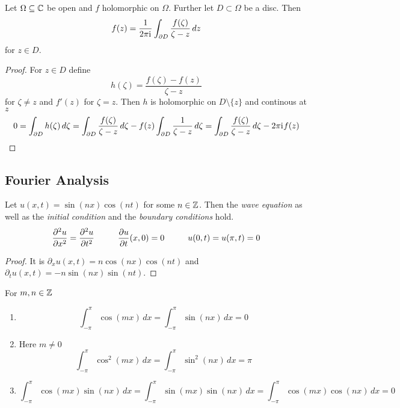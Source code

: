 \begin{theorem}
	Let \( \Omega \subseteq \mathbb{C} \) be open and \( f \) holomorphic on \( \Omega \). Further let \( D \subset \Omega \)
	be a disc. Then
	\[
		f(z) = \frac{1}{2\pi\iu} \int_{\boundary D} \frac{f(\zeta)}{\zeta - z}\,dz%
	\]
	for \( z \in D \).
\end{theorem}

\begin{proof}
	For \( z \in D \) define
	\[
		h(\zeta) = \frac{f(\zeta)- f(z)}{\zeta - z} %
	\]
	for \( \zeta \ne z \) and \( f'(z)  \) for \( \zeta = z \). Then \( h \) is holomorphic on \( D \setminus \{ z \} \) and
	continous at \( z \)
	\[
		0 = \int_{\partial D} h(\zeta) \,d\zeta
		= \int_{\partial D} \frac{f(\zeta)}{\zeta - z}\,d\zeta - f(z)\int_{\partial D} \frac{1}{\zeta - z}\,d\zeta
		= \int_{\partial D} \frac{f(\zeta)}{\zeta - z}\,d\zeta - 2\pi\mathrm{i}\mkern1mu f(z)
	\]
\end{proof}
\bigskip


\subsection{Fourier Analysis}
\bigskip

\begin{lemma}
	Let \( u(x, t) = \sin(nx) \cos(nt) \) for some \( n \in \mathbb{Z} \). Then the \emph{wave equation} as well as
	the \emph{initial condition} and the \emph{boundary conditions} hold.
	\[
		\frac{\partial^2 u}{\partial x^2} = \frac{\partial^2 u}{\partial t^2} \mspace{50mu}
		\frac{\partial u}{\partial t}(x, 0) = 0 \mspace{50mu}
		u(0, t) = u(\pi, t) = 0
	\]
\end{lemma}

\begin{proof}
	It is \( \partial_x u(x, t) = n \cos(nx) \cos(nt) \) and \( \partial_t u(x, t) = -n \sin(nx) \sin(nt) \).
\end{proof}
\bigskip


\begin{lemma}
	For \( m, n \in \mathbb{Z} \)
	\begin{enumerate}
		\item
		      \[
			      \int_{-\pi}^\pi \cos(mx)\,dx = \int_{-\pi}^\pi \sin(nx)\,dx =  0
		      \]
		\item Here \( m \ne 0 \)
		      \[
			      \int_{-\pi}^\pi \cos^2(mx)\,dx = \int_{-\pi}^\pi \sin^2(nx)\,dx = \pi
		      \]
		\item
		      \[
			      \int_{-\pi}^\pi \cos(mx)\sin(nx)\,dx = \int_{-\pi}^\pi \sin(mx) \sin(nx)\,dx
			      = \int_{-\pi}^\pi \cos(mx) \cos(nx)\,dx = 0
		      \]
	\end{enumerate}
\end{lemma}

